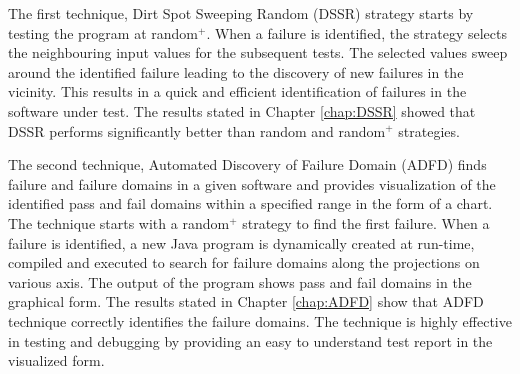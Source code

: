 






The first technique, Dirt Spot Sweeping Random (DSSR) strategy starts by testing the program at random$^+$. When a failure is identified, the strategy selects the neighbouring input values for the subsequent tests. The selected values sweep around the identified failure leading to the discovery of new failures in the vicinity. This results in a quick and efficient identification of failures in the software under test. The results stated in Chapter \ref{chap:DSSR} showed that DSSR performs significantly better than random and random$^+$ strategies.

The second technique, Automated Discovery of Failure Domain (ADFD) finds failure and failure domains in a given software and provides visualization of the identified pass and fail domains within a specified range in the form of a chart. The technique starts with a random$^+$ strategy to find the first failure. When a failure is identified, a new Java program is dynamically created at run-time, compiled and executed to search for failure domains along the projections on various axis. The output of the program shows pass and fail domains in the graphical form. The results stated in Chapter \ref{chap:ADFD} show that ADFD technique correctly identifies the failure domains. The technique is highly effective in testing and debugging by providing an easy to understand test report in the visualized form. 

